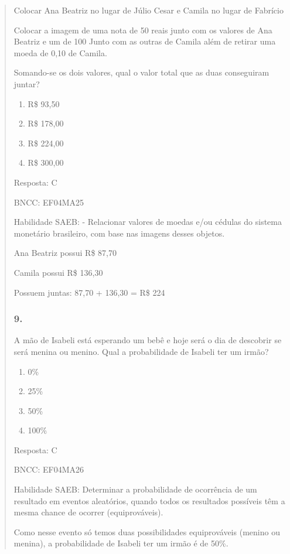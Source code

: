 \begin{enumerate}
\begin{escolha}
\begin{enumerate}
\begin{itemize}
\begin{itemize}
\begin{escolha}
\begin{quote}
\begin{escolha}
{Colocar Ana Beatriz no lugar de Júlio Cesar e Camila no lugar de
Fabrício

Colocar a imagem de uma nota de 50 reais junto com os valores de Ana
Beatriz e um de 100 Junto com as outras de Camila além de retirar uma
moeda de 0,10 de Camila.

Somando-se os dois valores, qual o valor total que as duas conseguiram
juntar?

\begin{enumerate}
\def\labelenumi{\alph{enumi})}
\item
  R\$ 93,50
\item
  R\$ 178,00
\item
  R\$ 224,00
\item
  R\$ 300,00
\end{enumerate}

Resposta: C

BNCC: EF04MA25

Habilidade SAEB: - Relacionar valores de moedas e/ou cédulas do sistema
monetário brasileiro, com base nas imagens desses objetos.

Ana Beatriz possui R\$ 87,70

Camila possui R\$ 136,30

Possuem juntas: 87,70 + 136,30 = R\$ 224

\subsubsection{9.}\label{section-150}

A mão de Isabeli está esperando um bebê e hoje será o dia de descobrir
se será menina ou menino. Qual a probabilidade de Isabeli ter um irmão?

\begin{enumerate}
\def\labelenumi{\alph{enumi})}
\item
  0\%
\item
  25\%
\item
  50\%
\item
  100\%
\end{enumerate}

Resposta: C

BNCC: EF04MA26

Habilidade SAEB: Determinar a probabilidade de ocorrência de um
resultado em eventos aleatórios, quando todos os resultados possíveis
têm a mesma chance de ocorrer (equiprováveis).

Como nesse evento só temos duas possibilidades equiprováveis (menino ou
menina), a probabilidade de Isabeli ter um irmão é de 50\%.

}
\end{escolha}
\end{quote}
\end{escolha}
\end{itemize}
\end{itemize}
\end{enumerate}
\end{escolha}
\end{enumerate}
